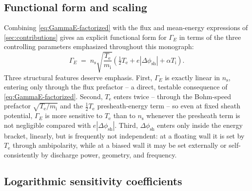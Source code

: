 \subsection{Functional form and scaling}

Combining \cref{eq:GammaE-factorized} with the flux and mean-energy expressions of \cref{sec:contributions} gives an explicit functional form for $\Gamma_{E}$ in terms of the three controlling parameters emphasized throughout this monograph:
\begin{equation}
\Gamma_{E} \;=\; n_{\mathrm{s}} \sqrt{\frac{T_{\mathrm{e}}}{m_{\mathrm{i}}}} \left(\tfrac{1}{2} T_{\mathrm{e}} + e|\Delta\phi_{\mathrm{sh}}| + \alpha T_{\mathrm{i}}\right).
\label{eq:GammaE-scaling}
\end{equation}
Three structural features deserve emphasis. First, $\Gamma_{E}$ is exactly linear in $n_{\mathrm{s}}$, entering only through the flux prefactor -- a direct, testable consequence of \cref{eq:GammaE-factorized}. Second, $T_{\mathrm{e}}$ enters twice -- through the Bohm-speed prefactor $\sqrt{T_{\mathrm{e}}/m_{\mathrm{i}}}$ and the $\tfrac12 T_{\mathrm{e}}$ presheath-energy term -- so even at fixed sheath potential, $\Gamma_{E}$ is more sensitive to $T_{\mathrm{e}}$ than to $n_{\mathrm{s}}$ whenever the presheath term is not negligible compared with $e|\Delta\phi_{\mathrm{sh}}|$. Third, $\Delta\phi_{\mathrm{sh}}$ enters only inside the energy bracket, linearly, but is frequently not independent: at a floating wall it is set by $T_{\mathrm{e}}$ through ambipolarity, while at a biased wall it may be set externally or self-consistently by discharge power, geometry, and frequency.

\subsection{Logarithmic sensitivity coefficients}

